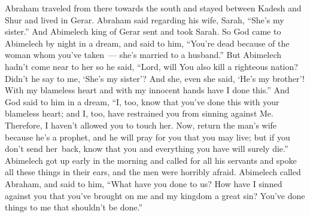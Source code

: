
\begin{inparaenum}
     Abraham traveled from there towards the south and stayed between Kadesh and Shur and lived in Gerar.%
     Abraham said regarding his wife, Sarah, ``She's my sister.'' And Abimelech king of Gerar sent and took Sarah.%
     So God came to Abimelech by night in a dream, and said to him, ``You're dead because of the woman whom you've taken~--- she's married to a husband.''%
     But Abimelech hadn't come near to her so he said, ``Lord, will You also kill a righteous nation?%
     Didn't he say to me, `She's my sister'? And she, even she said, `He's my brother'! With my blameless heart and with my innocent hands have I done this.''%
     And God said to him in a dream, ``I, too, know that you've done this with your blameless heart; and I, too, have restrained you from sinning against Me. Therefore, I haven't allowed you to touch her.%
     Now, return the man's wife because he's a prophet, and he will pray for you that you may live; but if you don't send her\understood\ back, know that you and everything you have will surely die.''%
     Abimelech got up early in the morning and called for all his servants and spoke all these things in their ears, and the men were horribly afraid.%
     Abimelech called Abraham, and said to him, ``What have you done to us? How have I sinned against you that you've brought on me and my kingdom a great sin? You've done things to me that shouldn't be done.''%

\end{inparaenum}
